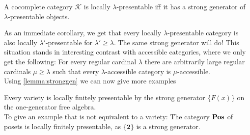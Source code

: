 \begin{Lemma}\label{lemma:stronggen}
A cocomplete category $\mathcal K$ is locally $\lambda$-presentable iff it has a strong generator of $\lambda$-presentable objects. 
\end{Lemma}

As an immediate corollary, we get that every locally $\lambda$-presentable category is also locally $\lambda'$-presentable for $\lambda' \geq \lambda$. The same strong generator will do! This situation stands in interesting contrast with accessible categories, where we only get the following: For every regular cardinal $\lambda$ there are arbitrarily large regular cardinals $\mu \geq \lambda$ such that every $\lambda$-accessible category is $\mu$-accessible. \\

Using \ref{lemma:stronggen} we can now give more examples

\begin{Example}
Every variety is locally finitely presentable by the strong generator $\{ F(x) \}$ on the one-generator free algebra. \\

To give an example that is not equivalent to a variety: The category $\mathbf{Pos}$ of posets is locally finitely presentable, as $\{\mathbf 2\}$ is a strong generator. %
\end{Example}


